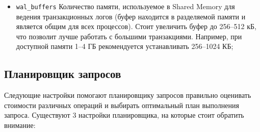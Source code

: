 \begin{itemize}
  \item \lstinline!wal_buffers! Количество памяти, используемое в Shared Memory для ведения транзакционных логов (буфер находится в разделяемой памяти и является общим для всех процессов). Стоит увеличить буфер до 256--512 кБ, что позволит лучше работать с большими транзакциями. Например, при доступной памяти 1--4 ГБ рекомендуется устанавливать 256--1024 КБ;
\end{itemize}


\subsection{Планировщик запросов}


Следующие настройки помогают планировщику запросов правильно оценивать стоимости различных операций и выбирать оптимальный план выполнения запроса. Существуют 3 настройки планировщика, на которые стоит обратить внимание:

